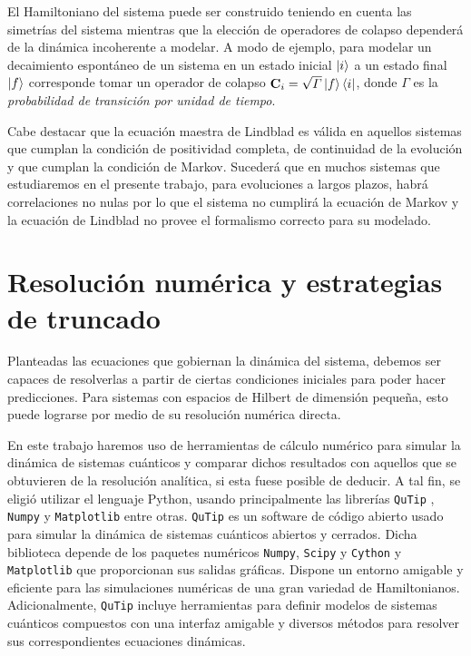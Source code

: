 \documentclass{report} %
\numberwithin{equation}{section}
\begin{document}
El Hamiltoniano del sistema puede ser construido teniendo en cuenta las simetrías del sistema mientras que la elección de operadores de colapso dependerá de la dinámica incoherente a modelar. A modo de ejemplo, para modelar un decaimiento espontáneo de un sistema en un estado inicial $\ket{i}$ a un estado final $\ket{f}$ corresponde tomar un operador de colapso $\mathbf{C}_i = \sqrt{\Gamma} \ket{f}\bra{i}$, donde $\Gamma$ es la \textit{probabilidad de transición por unidad de tiempo}.

{Cabe destacar que la ecuación maestra de Lindblad es válida en aquellos sistemas que cumplan la condición de positividad completa, de continuidad de la evolución y que cumplan la condición de Markov. Sucederá que en muchos sistemas que estudiaremos en el presente trabajo, para evoluciones a largos plazos, habrá correlaciones no nulas por lo que el sistema no cumplirá la ecuación de Markov y la ecuación de Lindblad no provee el formalismo correcto para su modelado.}

\section{Resoluci\'on num\'erica y estrategias de truncado}

Planteadas las ecuaciones que gobiernan la dinámica del sistema, debemos ser capaces de resolverlas a partir de ciertas condiciones iniciales para poder hacer predicciones. Para sistemas con espacios de Hilbert de dimensión pequeña, esto puede lograrse por medio de su resolución numérica  directa. 

En este trabajo haremos uso de herramientas de cálculo numérico para simular la dinámica de sistemas cuánticos y comparar dichos resultados con aquellos que se obtuvieren de la resolución analítica, si esta fuese posible de deducir. 
A tal fin, se eligió utilizar el lenguaje Python, usando principalmente las librerías \texttt{QuTip}
\cite{Qutip2-2013}, \texttt{Numpy} y \texttt{Matplotlib} entre otras.
\texttt{QuTip} es un software de código abierto usado para simular la dinámica de sistemas cuánticos abiertos y cerrados.
Dicha biblioteca depende de los paquetes numéricos \texttt{Numpy}, \texttt{Scipy} y \texttt{Cython} y \texttt{Matplotlib} que proporcionan sus salidas gráficas. 
Dispone un entorno amigable y eficiente para las simulaciones numéricas de una gran variedad de Hamiltonianos. Adicionalmente, \texttt{QuTip} incluye herramientas para definir modelos de sistemas cuánticos compuestos con una interfaz amigable y diversos métodos para resolver sus correspondientes ecuaciones dinámicas. \\
\end{document}
